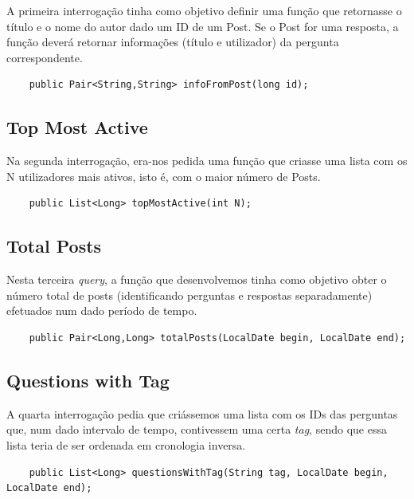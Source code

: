 \documentclass[a4paper, 11pt, oneside]{article}
\begin{document}
A primeira interrogação tinha como objetivo definir uma função que retornasse o título e o nome do autor dado um ID de um Post.
Se o Post for uma resposta, a função deverá retornar informações (título e utilizador) da pergunta correspondente.

\begin{lstlisting}
	public Pair<String,String> infoFromPost(long id);
\end{lstlisting}



\subsection{Top Most Active}

Na segunda interrogação, era-nos pedida uma função que criasse uma lista com os N utilizadores mais ativos, isto é, com o maior número de Posts.

\begin{lstlisting}
	public List<Long> topMostActive(int N);
\end{lstlisting}




\subsection{Total Posts}

Nesta terceira \textit{query}, a função que desenvolvemos tinha como objetivo obter o número total de posts (identificando perguntas e respostas separadamente) 
efetuados num dado período de tempo.

\begin{lstlisting}
	public Pair<Long,Long> totalPosts(LocalDate begin, LocalDate end);
\end{lstlisting}



\subsection{Questions with Tag}

A quarta interrogação pedia que criássemos uma lista com os IDs das perguntas que, num dado intervalo de tempo, contivessem uma certa \textit{tag}, sendo que essa 
lista teria de ser ordenada em cronologia inversa.

\begin{lstlisting}
	public List<Long> questionsWithTag(String tag, LocalDate begin, LocalDate end);
\end{lstlisting}
\end{document}
